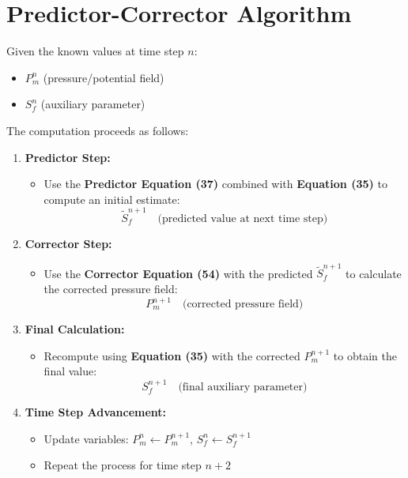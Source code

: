 \documentclass{article}
\begin{document}
\section*{Predictor-Corrector Algorithm}

Given the known values at time step $n$:
\begin{itemize}
    \item $P_m^n$ (pressure/potential field)
    \item $S_f^n$ (auxiliary parameter)
\end{itemize}

The computation proceeds as follows:

\begin{enumerate}
    \item \textbf{Predictor Step:}
    \begin{itemize}
        \item Use the \textbf{Predictor Equation (37)} combined with \textbf{Equation (35)} to compute an initial estimate:
        \[ \tilde{S}_f^{n+1} \quad \text{(predicted value at next time step)} \]
    \end{itemize}
    
    \item \textbf{Corrector Step:}
    \begin{itemize}
        \item Use the \textbf{Corrector Equation (54)} with the predicted $\tilde{S}_f^{n+1}$ to calculate the corrected pressure field:
        \[ P_m^{n+1} \quad \text{(corrected pressure field)} \]
    \end{itemize}
    
    \item \textbf{Final Calculation:}
    \begin{itemize}
        \item Recompute using \textbf{Equation (35)} with the corrected $P_m^{n+1}$ to obtain the final value:
        \[ S_f^{n+1} \quad \text{(final auxiliary parameter)} \]
    \end{itemize}
    
    \item \textbf{Time Step Advancement:}
    \begin{itemize}
        \item Update variables: $P_m^n \leftarrow P_m^{n+1}$, $S_f^n \leftarrow S_f^{n+1}$
        \item Repeat the process for time step $n+2$
    \end{itemize}
\end{enumerate}
\end{document}
